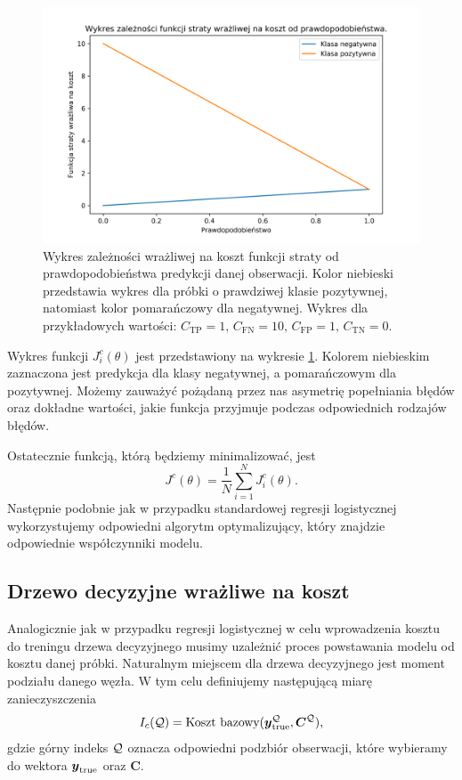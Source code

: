 \documentclass[inzynierska]{pwr_wmat_praca_dyplomowa}
\theoremstyle{plain}
\numberwithin{theorem}{chapter}
\theoremstyle{definition}
\numberwithin{theorem}{chapter}
\begin{document}
\begin{figure}
	\includegraphics[width=\linewidth]{images/cost_sensitive_ce.png}
	\caption{Wykres zależności wrażliwej na koszt funkcji straty od prawdopodobieństwa predykcji danej obserwacji. Kolor niebieski przedstawia wykres dla próbki o prawdziwej klasie pozytywnej, natomiast kolor pomarańczowy dla negatywnej. Wykres dla przykładowych wartości: $C_{\text{TP}} = 1 \text{, } C_{\text{FN}} = 10 \text{, } C_{\text{FP}} = 1 \text{, } C_{\text{TN}} = 0$.}
	\label{fig:cost-sensitive-loss-function}
\end{figure}

Wykres funkcji $J^c_i(\theta)$ jest przedstawiony na wykresie \ref{fig:cost-sensitive-loss-function}. Kolorem niebieskim zaznaczona jest predykcja dla klasy negatywnej, a pomarańczowym dla pozytywnej. Możemy zauważyć pożądaną przez nas asymetrię popełniania błędów oraz dokładne wartości, jakie funkcja przyjmuje podczas odpowiednich rodzajów błędów.

Ostatecznie funkcją, którą będziemy minimalizować, jest 
$$ J^c(\theta) = \frac{1}{N} \sum_{i=1}^{N} J^c_i(\theta) \text{.} $$
Następnie podobnie jak w przypadku standardowej regresji logistycznej wykorzystujemy odpowiedni algorytm optymalizujący, który znajdzie odpowiednie współczynniki modelu.

\subsection{Drzewo decyzyjne wrażliwe na koszt}
\label{csdt}
Analogicznie jak w przypadku regresji logistycznej w celu wprowadzenia kosztu do treningu drzewa decyzyjnego musimy uzależnić proces powstawania modelu od kosztu danej próbki. Naturalnym miejscem dla drzewa decyzyjnego jest moment podziału danego węzła. W tym celu definiujemy następującą miarę zanieczyszczenia
$$ I_c(\mathcal{Q}) = \text{Koszt bazowy}(\boldsymbol{y}_{\text{true}}^{\mathcal{Q}}, \boldsymbol{C}^{\mathcal{Q}}) \text{,}$$
gdzie górny indeks $\mathcal{Q}$ oznacza odpowiedni podzbiór obserwacji, które wybieramy do wektora $\boldsymbol{y}_{\text{true}}$ oraz $\boldsymbol{C}$.
\end{document}
